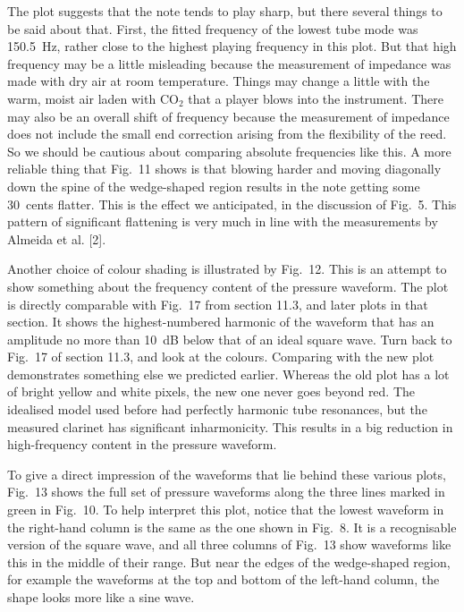   The plot suggests that the note tends to play sharp, but there several things 
  to be said about that. First, the fitted frequency of the lowest tube mode 
  was 150.5~Hz, rather close to the highest playing frequency in this plot. But 
  that high frequency may be a little misleading because the measurement of 
  impedance was made with dry air at room temperature. Things may change a 
  little with the warm, moist air laden with $\mathrm{CO}_2$ that a player 
  blows into the instrument. There may also be an overall shift of frequency 
  because the measurement of impedance does not include the small end 
  correction arising from the flexibility of the reed. So we should be cautious 
  about comparing absolute frequencies like this. A more reliable thing that 
  Fig.\ 11 shows is that blowing harder and moving diagonally down the spine of 
  the wedge-shaped region results in the note getting some 30~cents flatter. 
  This is the effect we anticipated, in the discussion of Fig.\ 5. This pattern 
  of significant flattening is very much in line with the measurements by 
  Almeida et al. [2]. 

  Another choice of colour shading is illustrated by Fig.\ 12. This is an 
  attempt to show something about the frequency content of the pressure 
  waveform. The plot is directly comparable with Fig.\ 17 from section 11.3, 
  and later plots in that section. It shows the highest-numbered harmonic of 
  the waveform that has an amplitude no more than 10~dB below that of an ideal 
  square wave. Turn back to Fig.\ 17 of section 11.3, and look at the colours. 
  Comparing with the new plot demonstrates something else we predicted earlier. 
  Whereas the old plot has a lot of bright yellow and white pixels, the new one 
  never goes beyond red. The idealised model used before had perfectly harmonic 
  tube resonances, but the measured clarinet has significant inharmonicity. 
  This results in a big reduction in high-frequency content in the pressure 
  waveform. 

  To give a direct impression of the waveforms that lie behind these various 
  plots, Fig.\ 13 shows the full set of pressure waveforms along the three 
  lines marked in green in Fig.\ 10. To help interpret this plot, notice that 
  the lowest waveform in the right-hand column is the same as the one shown in 
  Fig.\ 8. It is a recognisable version of the square wave, and all three 
  columns of Fig.\ 13 show waveforms like this in the middle of their range. 
  But near the edges of the wedge-shaped region, for example the waveforms at 
  the top and bottom of the left-hand column, the shape looks more like a sine 
  wave. 


